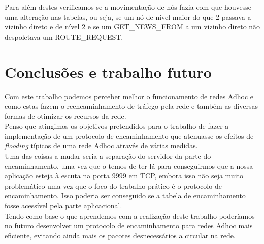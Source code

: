 \documentclass{llncs}
\begin{document}
Para além destes verificamos se a movimentação de nós fazia com que houvesse uma alteração nas tabelas, ou seja, se um nó de nível maior do que 2 passava a vizinho direto e de nível 2 e se um GET\_NEWS\_FROM a um vizinho direto não despoletava um ROUTE\_REQUEST.

\section{Conclusões e trabalho futuro}

Com este trabalho podemos perceber melhor o funcionamento de redes Adhoc e como estas fazem o reencaminhamento de tráfego pela rede e também as diversas formas de otimizar os recursos da rede.\\
Penso que atingimos os objetivos pretendidos para o trabalho de fazer a implementação de um protocolo de encaminhamento que atenuasse os efeitos de \emph{flooding} típicos de uma rede Adhoc através de várias medidas.\\
Uma das coisas a mudar seria a separação do servidor da parte do encaminhamento, uma vez que o temos de ter lá para conseguirmos que a nossa aplicação esteja à escuta na porta 9999 em TCP, embora isso não seja muito problemático uma vez que o foco do trabalho prático é o protocolo de encaminhamento. Isso poderia ser conseguido se a tabela de encaminhamento fosse acessível pela parte aplicacional.\\

Tendo como base o que aprendemos com a realização deste trabalho poderíamos no futuro desenvolver um protocolo de encaminhamento para redes Adhoc mais eficiente, evitando ainda mais os pacotes desnecessários a circular na rede.


\clearpage
\end{document}
